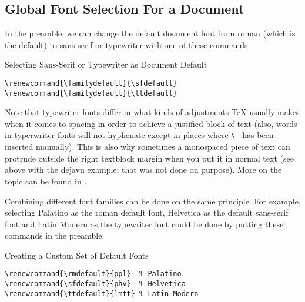 \documentclass[a4paper,oneside,11pt]{article}
\newcommand\code[1]{\texttt{#1}}
\begin{document}
\subsection{Global Font Selection For a Document}
\label{subsec:fontsel:global}


In the preamble, we can change the  default document font from roman (which is
the default) to sans serif or typewriter with one of these commands:

\begin{titled-frame}
{\textsf{Selecting Sans-Serif or Typewriter as Document Default}}
\vspace{-1em}
\begin{verbatim}
\renewcommand{\familydefault}{\sfdefault}
\renewcommand{\familydefault}{\ttdefault}
\end{verbatim}
\vspace{-1em}
\end{titled-frame}

Note that typewriter fonts differ in  what kinds of adjustments \TeX{} usually
makes when it comes  to spacing in order to achieve a  justified block of text
(also,  words  in  typerwriter  fonts  will not  hyphenate  except  in  places
where    \code{\textbackslash{}-}  has been  inserted manually). This  is also
why  sometimes a  monospaced  piece of  text can  protrude  outside the  right
textblock margin  when you put  it in normal text  (see above with  the dejavu
example; that  was not  done on purpose). More  on the topic  can be  found in
\cite{texblog:typewriter}.

Combining different  font families  can be  done on  the same  principle.  For
example,  selecting Palatino  as  the  roman default  font,  Helvetica as  the
default sans-serif font and Latin Modern  as the typewriter font could be done
by putting these commands in the preamble:

\begin{titled-frame}
{\textsf{Creating a Custom Set of Default Fonts}}
\vspace{-1em}
\begin{verbatim}
\renewcommand{\rmdefault}{ppl}  % Palatino
\renewcommand{\sfdefault}{phv}  % Helvetica
\renewcommand{\ttdefault}{lmtt} % Latin Modern
\end{verbatim}
\vspace{-1em}
\end{titled-frame}
\end{document}
